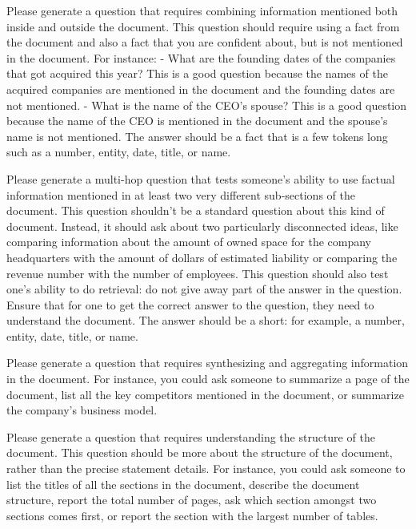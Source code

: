\begin{examplebox}
    \small
    \ttfamily
Please generate a question that requires
combining information mentioned both inside and outside the document.
This question should require using a fact from the document and also a fact that
you are confident about, but is not mentioned in the document. For instance:
- What are the founding dates of the companies that got acquired this year?
  This is a good question because the names of the acquired companies are
  mentioned in the document and the founding dates are not mentioned.
- What is the name of the CEO's spouse?  This is a good question because the
  name of the CEO is mentioned in the document and the spouse's name is not
  mentioned.
The answer should be a fact that is a few tokens long such as a number, entity,
date, title, or name.
\end{examplebox}
\begin{examplebox}
    \small
    \ttfamily
Please generate a multi-hop question that
tests someone's ability to use factual information mentioned in at least two
very different sub-sections of the document.
This question shouldn't be a standard question about this kind of document.
Instead, it should ask about two particularly disconnected ideas, like
comparing information about the amount of owned space for the company
headquarters with the amount of dollars of estimated liability or comparing
the revenue number with the number of employees.
This question should also test one's ability to do retrieval: do not give
away part of the answer in the question. Ensure that for one to get the
correct answer to the question, they need to understand the document.
The answer should be a short: for example, a number, entity, date, title,
or name.
\end{examplebox}
\begin{examplebox}
    \small
    \ttfamily
Please generate a question that requires
synthesizing and aggregating information in the document.
For instance, you could ask someone to summarize a page of the document, list
all the key competitors mentioned in the document, or summarize the company's
business model.
\end{examplebox}
\begin{examplebox}
    \small
    \ttfamily
Please generate a question that requires
understanding the structure of the document.
This question should be more about the structure of the document, rather than
the precise statement details. For instance, you could ask someone to list the
titles of all the sections in the document, describe the document structure,
report the total number of pages, ask which section amongst two sections comes
first, or report the section with the largest number of tables.
\end{examplebox}
